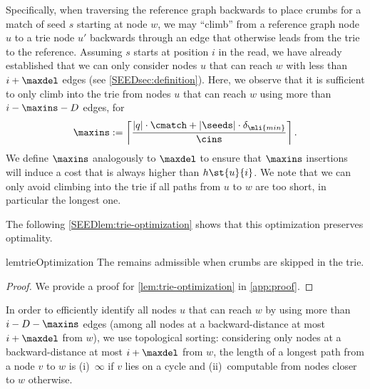 Specifically, when traversing the reference graph backwards to place crumbs for
a match of seed $s$ starting at node $w$, we may ``climb'' from a reference
graph node $u$ to a trie node $u'$ backwards through an edge that otherwise
leads from the trie to the reference.
%
Assuming $s$ starts at position $i$ in the read, we have already established
that we can only consider nodes $u$ that can reach $w$ with less than
$i+\maxdel$ edges (see \cref{SEEDsec:definition}).
%
Here, we observe that it is sufficient to only climb into the trie from nodes
$u$ that can reach $w$ using more than~$i-\maxins-D$ edges, for
\begin{align}
	\maxins := \left\lceil \frac{\lvert q \rvert \cdot \cmatch + |\seeds| \cdot \delta_{\mli{min}}}{\cins} \right\rceil.
\end{align}
%
We define $\maxins$ analogously to $\maxdel$ to ensure that $\maxins$ insertions
will induce a cost that is always higher than $h\st{u}{i}$. We note that we can
only avoid climbing into the trie if all paths from $u$ to $w$ are too short, in
particular the longest one.

The following \cref{SEEDlem:trie-optimization} shows that this optimization
preserves optimality.

\begin{restatable}{lem}{trieOptimization}
	\label{lem:trie-optimization}
	The \sh remains admissible when crumbs are skipped in the trie.
\end{restatable}
\begin{proof}
	We provide a proof for \cref{lem:trie-optimization} in \cref{app:proof}.
	\qedhere
\end{proof}

In order to efficiently identify all nodes $u$ that can reach $w$ by using more
than $i-D-\maxins$ edges (among all nodes at a backward-distance at most
$i+\maxdel$ from $w$), we use topological sorting: considering only nodes at a
backward-distance at most $i+\maxdel$ from $w$, the length of a longest path
from a node $v$ to $w$ is (i)~$\infty$ if $v$ lies on a cycle and
(ii)~computable from nodes closer to $w$ otherwise.
